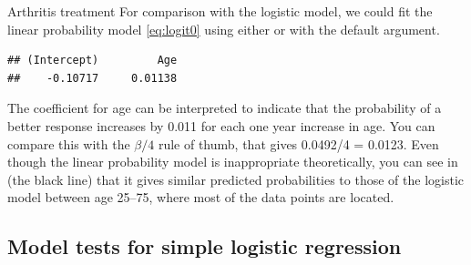 \documentclass[11pt]{book}
\renewenvironment{knitrout}{\small\renewcommand{\baselinestretch}{.85}}{} %
\begin{document}
\begin{Example}[arthrit6]{Arthritis treatment}
For comparison with the logistic model, we could fit the linear probability model
\eqref{eq:logit0} using either  or  with the default
 argument.
\begin{knitrout}
\color{fgcolor}\begin{kframe}
\begin{alltt}
 \hlkwb{<-}  \hlopt{~}  
\end{alltt}
\begin{verbatim}
## (Intercept)         Age 
##    -0.10717     0.01138
\end{verbatim}
\end{kframe}
\end{knitrout}
The coefficient for age can be interpreted to indicate that the probability of a better
response increases by 0.011 for each one year increase in age.  You can compare this
with the $\beta / 4$ rule of thumb, that gives 0.0492/4 = 0.0123.
Even though the linear probability model is inappropriate theoretically, you can
see in  (the black line)
that it gives similar predicted probabilities to those of the logistic
model between age 25--75, where most of the data points are located.


\end{Example}

\subsection{Model tests for simple logistic regression}\label{sec:logist-tests}
\end{document}
